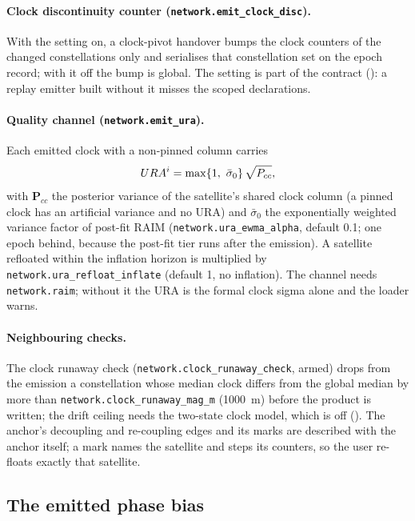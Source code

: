 \documentclass[main.tex]{subfiles}
\begin{document}
\paragraph{Clock discontinuity counter (\texttt{network.emit\_clock\_disc}).}
With the setting on, a clock-pivot handover bumps the clock counters of the
changed constellations only and serialises that constellation set on the
epoch record; with it off the bump is global. The setting is part of the
contract (): a replay emitter built without it
misses the scoped declarations.

\paragraph{Quality channel (\texttt{network.emit\_ura}).}
Each emitted clock with a non-pinned column carries
\begin{equation}
\mathrm{URA}^\sat = \max\{1,\ \bar\sigma_0\}\,\sqrt{\bm{P}_{cc}} ,
\label{eq:wire-ura}
\end{equation}
with $\bm{P}_{cc}$ the posterior variance of the satellite's shared clock
column (a pinned clock has an artificial variance and no URA) and
$\bar\sigma_0$ the exponentially weighted variance factor of post-fit RAIM
(\texttt{network.ura\_ewma\_alpha}, default 0.1; one epoch behind, because the
post-fit tier runs after the emission). A satellite refloated within the
inflation horizon is multiplied by \texttt{network.ura\_refloat\_inflate}
(default 1, no inflation). The channel needs \texttt{network.raim}; without
it the URA is the formal clock sigma alone and the loader warns.

\paragraph{Neighbouring checks.}
The clock runaway check (\texttt{network.clock\_runaway\_check}, armed)
drops from the emission a constellation whose median clock differs from the
global median by more than \texttt{network.clock\_runaway\_mag\_m} (1000~m)
before the product is written; the drift ceiling needs the two-state clock
model, which is off
(). The anchor's
decoupling and re-coupling edges and its marks are described with the
anchor itself; a mark names the satellite and steps its counters, so the
user re-floats exactly that satellite.

\subsection{The emitted phase bias}\label{sec:net-wire-pb}
\end{document}
